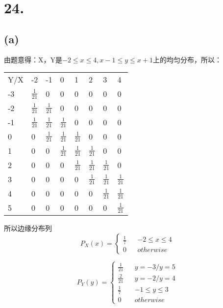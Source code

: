 \documentclass[UTF8]{report}
\begin{document}
    \section*{24.}
        \subsection*{(a)}
            由题意得：X，Y是$-2 \leq x \leq 4, x - 1 \leq y \leq x + 1$上的均匀分布，所以：
            \begin{table}[!htbp]
                \begin{tabular}{llllllll}
                    Y/X & -2 & -1 & 0 & 1 & 2 & 3 & 4 \\
                    -3 & $\frac{1}{21}$ & 0 & 0 & 0 & 0 & 0 & 0\\
                    -2 & $\frac{1}{21}$ & $\frac{1}{21}$ & 0 & 0 & 0 & 0 & 0\\
                    -1 & $\frac{1}{21}$ & $\frac{1}{21}$ & $\frac{1}{21}$ & 0 & 0 & 0 & 0\\
                    0 & 0 & $\frac{1}{21}$ & $\frac{1}{21}$ & $\frac{1}{21}$ & 0 & 0 & 0\\
                    1 & 0 & 0 & $\frac{1}{21}$ & $\frac{1}{21}$ & $\frac{1}{21}$ & 0 & 0\\
                    2 & 0 & 0 & 0 & $\frac{1}{21}$ & $\frac{1}{21}$ & $\frac{1}{21}$ & 0\\
                    3 & 0 & 0 & 0 & 0 & $\frac{1}{21}$ & $\frac{1}{21}$ & $\frac{1}{21}$\\
                    4 & 0 & 0 & 0 & 0 & 0 & $\frac{1}{21}$ & $\frac{1}{21}$\\
                    5 & 0 & 0 & 0 & 0 & 0 & 0 & $\frac{1}{21}$\\
                \end{tabular}
            \end{table}

            所以边缘分布列$$P_X(x) = \left\{\begin{array}{lcr}
                \frac{1}{7} & & -2 \leq x \leq 4 \\
                0 & & otherwise
            \end{array}\right.$$

            $$P_Y(y) = \left\{\begin{array}{lcr}
                \frac{1}{21} & & y = -3/y = 5\\
                \frac{2}{21} & & y = -2/y = 4\\
                \frac{1}{7} & & -1 \leq y \leq 3\\
                0 & & otherwise
            \end{array}\right.$$
\end{document}
